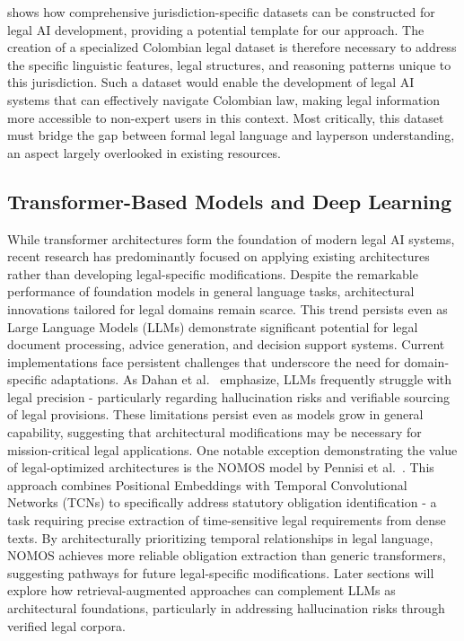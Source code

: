 shows how comprehensive jurisdiction-specific datasets can be constructed for 
legal AI development, providing a potential template for our approach.
The creation of a specialized Colombian legal dataset is therefore necessary 
to address the specific linguistic features, legal structures, and reasoning 
patterns unique to this jurisdiction. Such a dataset would enable the development 
of legal AI systems that can effectively navigate Colombian law, making legal 
information more accessible to non-expert users in this context. Most critically, 
this dataset must bridge the gap between formal legal language and layperson 
understanding, an aspect largely overlooked in existing resources.

\subsection{Transformer-Based Models and Deep Learning}
While transformer architectures form the foundation of modern legal AI systems, 
recent research has predominantly focused on applying existing architectures rather 
than developing legal-specific modifications. Despite the remarkable performance of 
foundation models in general language tasks, architectural innovations tailored for 
legal domains remain scarce. This trend persists even as Large Language Models (LLMs) 
demonstrate significant potential for legal document processing, advice generation, and 
decision support systems.
Current implementations face persistent challenges that underscore the need for 
domain-specific adaptations. As Dahan et al.~\cite{dahan2023lawyers} emphasize, 
LLMs frequently struggle with legal precision - particularly regarding hallucination 
risks and verifiable sourcing of legal provisions. These limitations persist even as models 
grow in general capability, suggesting that architectural modifications may be necessary 
for mission-critical legal applications.
One notable exception demonstrating the value of legal-optimized architectures is the
NOMOS model by Pennisi et al.~\cite{pennisi-etal-2023-nomos}. This approach combines 
Positional Embeddings with Temporal Convolutional Networks (TCNs) to specifically address 
statutory obligation identification - a task requiring precise extraction of time-sensitive 
legal requirements from dense texts. By architecturally prioritizing temporal relationships 
in legal language, NOMOS achieves more reliable obligation extraction than generic transformers, 
suggesting pathways for future legal-specific modifications.
Later sections will explore how retrieval-augmented approaches can complement LLMs as architectural 
foundations, particularly in addressing hallucination risks through verified legal corpora.

